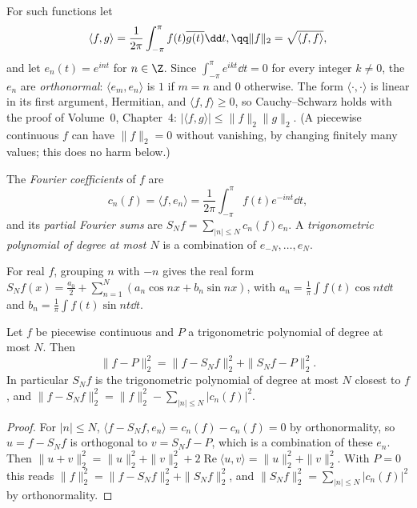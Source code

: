 For such functions let
\[
\begin{gathered}\langle f,g\rangle=\frac1{2\pi}\int_{-\pi}^\pi f(t)\overline{g(t)}\dd t,\qq\|f\|_2=\sqrt{\langle f,f\rangle},\end{gathered}
\]
and let $e_n(t)=e^{int}$ for $n\in\Z$. Since $\int_{-\pi}^\pi e^{ikt}\dd t=0$ for every integer $k\ne0$, the $e_n$ are \emph{orthonormal}:
$\langle e_m,e_n\rangle$ is $1$ if $m=n$ and $0$ otherwise. The form $\langle\cdot,\cdot\rangle$ is linear in its first argument, Hermitian, and
$\langle f,f\rangle\ge0$, so Cauchy--Schwarz holds with the proof of Volume~0, Chapter~4: $|\langle f,g\rangle|\le\|f\|_2\|g\|_2$. (A piecewise continuous
$f$ can have $\|f\|_2=0$ without vanishing, by changing finitely many values; this does no harm below.)

\begin{definition}
The \emph{Fourier coefficients} of $f$ are
\[
c_n(f)=\langle f,e_n\rangle=\frac1{2\pi}\int_{-\pi}^\pi f(t)e^{-int}\dd t,
\]
and its \emph{partial Fourier sums}
are $S_Nf=\sum_{|n|\le N}c_n(f)e_n$. A \emph{trigonometric polynomial of degree at most $N$} is a combination of $e_{-N},\dots,e_N$.
\end{definition}

For real $f$, grouping $n$ with $-n$ gives the real form $S_Nf(x)=\frac{a_0}2+\sum_{n=1}^N(a_n\cos nx+b_n\sin nx)$, with
$a_n=\frac1\pi\int f(t)\cos nt\dd t$ and $b_n=\frac1\pi\int f(t)\sin nt\dd t$.

\begin{proposition}\label{prop:bestapprox}
Let $f$ be piecewise continuous and $P$ a trigonometric polynomial of degree at most $N$. Then
\[
\|f-P\|_2^2=\|f-S_Nf\|_2^2+\|S_Nf-P\|_2^2.
\]
In particular $S_Nf$ is the trigonometric polynomial of degree at most $N$ closest to $f$, and
$\|f-S_Nf\|_2^2=\|f\|_2^2-\sum_{|n|\le N}|c_n(f)|^2$.
\end{proposition}
\begin{proof}
For $|n|\le N$, $\langle f-S_Nf,e_n\rangle=c_n(f)-c_n(f)=0$ by orthonormality, so $u=f-S_Nf$ is orthogonal to $v=S_Nf-P$, which is a
combination of these $e_n$. Then $\|u+v\|_2^2=\|u\|_2^2+\|v\|_2^2+2\operatorname{Re}\langle u,v\rangle=\|u\|_2^2+\|v\|_2^2$. With $P=0$ this reads
$\|f\|_2^2=\|f-S_Nf\|_2^2+\|S_Nf\|_2^2$, and $\|S_Nf\|_2^2=\sum_{|n|\le N}|c_n(f)|^2$ by orthonormality.
\end{proof}

